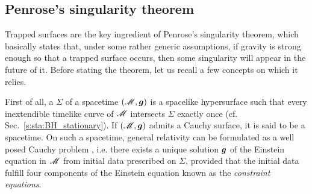 \subsection{Penrose's singularity theorem}

Trapped surfaces are the key ingredient of Penrose's singularity theorem,
which basically states that, under some rather generic assumptions, if gravity is
strong enough so that a trapped surface occurs, then some singularity will
appear in the future of it.
Before stating the theorem, let us recall a few concepts on which it relies.

First of all, a 
$\Sigma$ of a spacetime $(\mathscr{M},\bm{g})$ is a spacelike
hypersurface such that every inextendible timelike curve of $\mathscr{M}$
intersects $\Sigma$ exactly once (cf. Sec.~\ref{s:sta:BH_stationary}). If $(\mathscr{M},\bm{g})$
admits a Cauchy surface, it is said to be a
 spacetime.
On such a spacetime, general relativity can be formulated as a well posed
Cauchy problem \cite{ChoquG69},
i.e. there exists a unique solution $\bm{g}$ of the Einstein equation
in $\mathscr{M}$ from initial data prescribed on $\Sigma$, provided that the initial data
fulfill four components of the Einstein equation known as the
\emph{constraint equations}.

